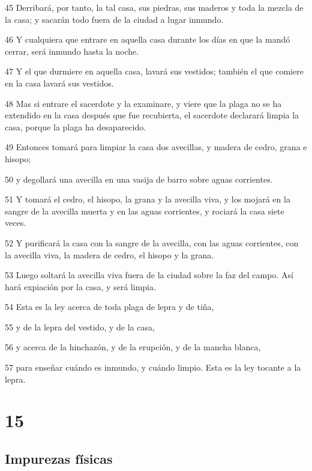 \par 45 Derribará, por tanto, la tal casa, sus piedras, sus maderos y toda la mezcla de la casa; y sacarán todo fuera de la ciudad a lugar inmundo.
\par 46 Y cualquiera que entrare en aquella casa durante los días en que la mandó cerrar, será inmundo hasta la noche.
\par 47 Y el que durmiere en aquella casa, lavará sus vestidos; también el que comiere en la casa lavará sus vestidos.
\par 48 Mas si entrare el sacerdote y la examinare, y viere que la plaga no se ha extendido en la casa después que fue recubierta, el sacerdote declarará limpia la casa, porque la plaga ha desaparecido.
\par 49 Entonces tomará para limpiar la casa dos avecillas, y madera de cedro, grana e hisopo;
\par 50 y degollará una avecilla en una vasija de barro sobre aguas corrientes.
\par 51 Y tomará el cedro, el hisopo, la grana y la avecilla viva, y los mojará en la sangre de la avecilla muerta y en las aguas corrientes, y rociará la casa siete veces.
\par 52 Y purificará la casa con la sangre de la avecilla, con las aguas corrientes, con la avecilla viva, la madera de cedro, el hisopo y la grana.
\par 53 Luego soltará la avecilla viva fuera de la ciudad sobre la faz del campo. Así hará expiación por la casa, y será limpia.
\par 54 Esta es la ley acerca de toda plaga de lepra y de tiña,
\par 55 y de la lepra del vestido, y de la casa,
\par 56 y acerca de la hinchazón, y de la erupción, y de la mancha blanca,
\par 57 para enseñar cuándo es inmundo, y cuándo limpio. Esta es la ley tocante a la lepra.

\chapter{15}

\section*{Impurezas físicas}

